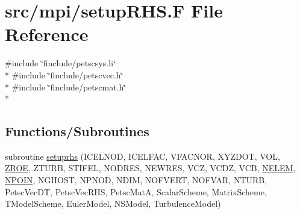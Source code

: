 \hypertarget{mpi_2setup_r_h_s_8_f}{\section{src/mpi/setup\-R\-H\-S.F File Reference}
\label{mpi_2setup_r_h_s_8_f}
}
{\ttfamily \#include \char`\"{}finclude/petscsys.\-h\char`\"{}}\\*
{\ttfamily \#include \char`\"{}finclude/petscvec.\-h\char`\"{}}\\*
{\ttfamily \#include \char`\"{}finclude/petscmat.\-h\char`\"{}}\\*
\subsection*{Functions/\-Subroutines}
\begin{DoxyCompactItemize}
\item 
subroutine \hyperlink{mpi_2setup_r_h_s_8_f_a718e288d437007ef5bc48b3f57941f65}{setuprhs} (I\-C\-E\-L\-N\-O\-D, I\-C\-E\-L\-F\-A\-C, V\-F\-A\-C\-N\-O\-R, X\-Y\-Z\-D\-O\-T, V\-O\-L, \hyperlink{myts_8com_a0c4fbcdb78e6b50c8919d714e4b5a694}{Z\-R\-O\-E}, Z\-T\-U\-R\-B, S\-T\-I\-F\-E\-L, N\-O\-D\-R\-E\-S, N\-E\-W\-R\-E\-S, V\-C\-Z, V\-C\-D\-Z, V\-C\-B, \hyperlink{mesh_8com_aee5e75b79d0e815c0603cfbccc618957}{N\-E\-L\-E\-M}, \hyperlink{mesh_8com_ae28c1572321efcd8715b974d87d20c58}{N\-P\-O\-I\-N}, N\-G\-H\-O\-S\-T, N\-P\-N\-O\-D, N\-D\-I\-M, N\-O\-F\-V\-E\-R\-T, N\-O\-F\-V\-A\-R, N\-T\-U\-R\-B, Petsc\-Vec\-D\-T, Petsc\-Vec\-R\-H\-S, Petsc\-Mat\-A, Scalar\-Scheme, Matrix\-Scheme, T\-Model\-Scheme, Euler\-Model, N\-S\-Model, Turbulence\-Model)
\end{DoxyCompactItemize}


